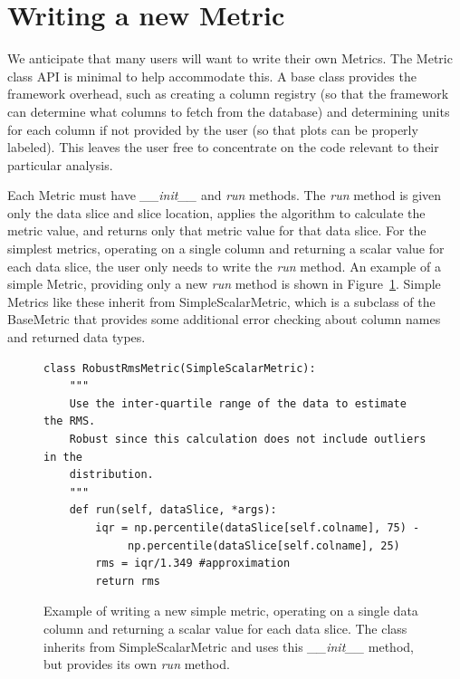 \documentclass[]{spie}  %
\begin{document}


\section{Writing a new Metric}
\label{sec:MetricAPI}

We anticipate that many users will want to write their own Metrics.
The Metric class API is minimal to help accommodate
this. A base class provides the framework overhead, such as creating a
column registry (so that the framework can determine what columns to
fetch from the database) and determining units for each column if not
provided by the user (so that plots can be properly labeled). This
leaves the user free to concentrate on the code relevant to their
particular analysis.

Each Metric must have {\it \_\_init\_\_} and {\it run} methods. The
{\it run} method is given only the data slice and slice location, applies the algorithm
to calculate the metric value, and returns only that metric value for
that data slice. For the simplest metrics,
operating on a single column and returning a scalar value for each
data slice, the user only needs to write the {\it run} method.  An
example of a simple Metric, providing only a new {\it run} method is
shown in Figure~\ref{fig:simplemetric}. Simple Metrics like these
inherit from SimpleScalarMetric, which is a subclass of the BaseMetric
that provides some additional error checking about column names and
returned data types.

\begin{figure}
\centering
\begin{lstlisting}[frame=single]
class RobustRmsMetric(SimpleScalarMetric):
    """
    Use the inter-quartile range of the data to estimate the RMS.  
    Robust since this calculation does not include outliers in the
    distribution.
    """
    def run(self, dataSlice, *args):
        iqr = np.percentile(dataSlice[self.colname], 75) - 
             np.percentile(dataSlice[self.colname], 25)
        rms = iqr/1.349 #approximation
        return rms
\end{lstlisting}
\caption[]
{ \label{fig:simplemetric} Example of writing a new simple metric,
  operating on a single data column and returning a scalar value for
  each data slice. The class inherits from SimpleScalarMetric and uses
  this {\it \_\_init\_\_} method, but provides its own {\it run}
  method. }
\end{figure}
\end{document}
